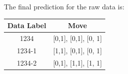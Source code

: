 \documentclass[10pt,twocolumn,letterpaper]{article}
\begin{document}
The final prediction for the raw data is:
\begin{center}
    \begin{tabular}{|c|c|}
        \hline
        Data Label & Move                 \\
        \hline
        1234       & [0,1], [0,1], [0, 1] \\
        \hline
        1234-1     & [1,1], [0,1], [0, 1] \\
        \hline
        1234-2     & [0,1], [1,1], [1, 1] \\
        \hline
    \end{tabular}
\end{center}
\end{document}
